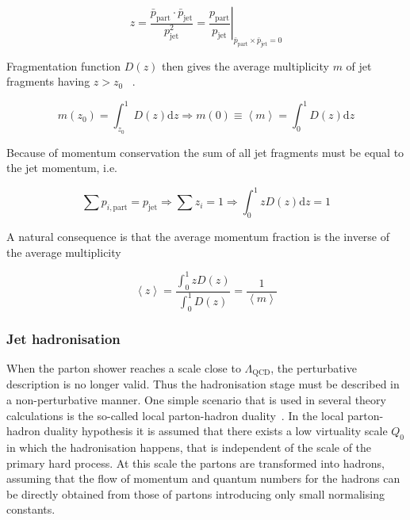 \begin{equation}
z = \frac{\bar p_{\mathrm{part}} \cdot \bar p_{\mathrm{jet}}}{p^2_{\mathrm{jet}}} = \left.\frac{p_{\mathrm{part}}}{p_{\mathrm{jet}}}\right\vert_{\bar{p}_\mathrm{part} \times \bar{p}_\mathrm{jet}=0}
\end{equation}

Fragmentation function $D\left(z\right)$ then gives the average multiplicity $m$ of jet fragments having $z > z_0$ ~\cite{}. 

\begin{equation}
m\left(z_0\right) = \int_{z_0}^1 D\left(z\right) \mathrm{d} z \Rightarrow m\left(0\right) \equiv \left< m \right> = \int_0^1 D\left(z\right) \mathrm{d}z
\end{equation}

Because of momentum conservation the sum of all jet fragments must be equal to the jet momentum, i.e. 

\begin{equation}
\sum p_{i,\mathrm{part}} = p_\mathrm{jet} \Rightarrow \sum z_i = 1 \Rightarrow \int_0^1 z D\left(z\right) \mathrm{d} z = 1
\end{equation}

A natural consequence is that the average momentum fraction is the inverse of the average multiplicity

\begin{equation}
\left<z \right> = \frac{\int_0^1 z D\left(z\right) }{\int_0^1 D\left(z\right) } = \frac{1}{\left< m \right>}
\end{equation}


\subsubsection{Jet hadronisation}
When the parton shower reaches a scale close to $\Lambda_{\mathrm{QCD}}$, the perturbative description is no longer valid. Thus the hadronisation stage must be described in a non-perturbative manner. One simple scenario that is used in several theory calculations is the so-called local parton-hadron duality~\cite{Azimov1985}. In the local parton-hadron duality hypothesis it is assumed that there exists a low virtuality scale $Q_0$ in which the hadronisation happens, that is independent of the scale of the primary hard process. At this scale the partons are transformed into hadrons, assuming that the flow of momentum and quantum numbers for the hadrons can be directly obtained from those of partons introducing only small normalising constants. 

